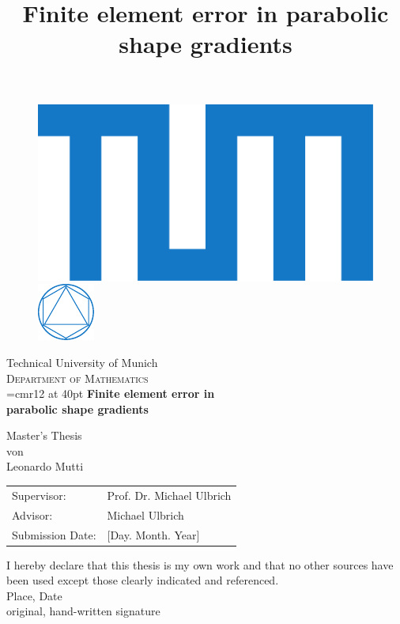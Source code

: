 \documentclass[english,a4paper,9pt,oneside]{scrbook}	%
\theoremstyle{break}
\theoremstyle{remark}
\begin{document}
\pagestyle{empty}       %
\vspace*{3cm}
\begin{figure}[H]
\centering
\includegraphics[height=0.075\columnwidth]{Logos/blau/2015_Logo_TUM_CMYK.pdf}
\hspace{90pt}
\includegraphics[height=0.075\columnwidth]{Logos/08_Mathematik/MA_blau/FAK_MA_CMYK.pdf}
\end{figure}
\vspace*{1.5cm}
\begin{center}
{\Huge Technical University of Munich}
\\
\vspace*{1.5cm}
{\huge \textsc{Department of Mathematics}}
\\
\vspace*{3cm}
\font\myfont=cmr12 at 40pt
{\Huge \textbf{Finite element error in\\parabolic shape gradients\\}}
\title{Finite element error in parabolic shape gradients}
\vspace*{3cm}
{\Large Master's Thesis}\linebreak \\
{\Large von}\linebreak \\
{\Large Leonardo Mutti}\\
\vspace*{3cm}
{\Large 
\begin{tabular}{ll}
Supervisor: & Prof. Dr. Michael Ulbrich\\
Advisor: & Michael Ulbrich\\
Submission Date: & [Day. Month. Year]
\end{tabular}
}
\end{center}

\newpage    %

\vspace*{18cm}
\noindent
I hereby declare that this thesis is my own work and that no other sources have been used except those clearly indicated and referenced.
\\[2cm]
Place, Date\\
original, hand-written signature
\newpage
\end{document}

